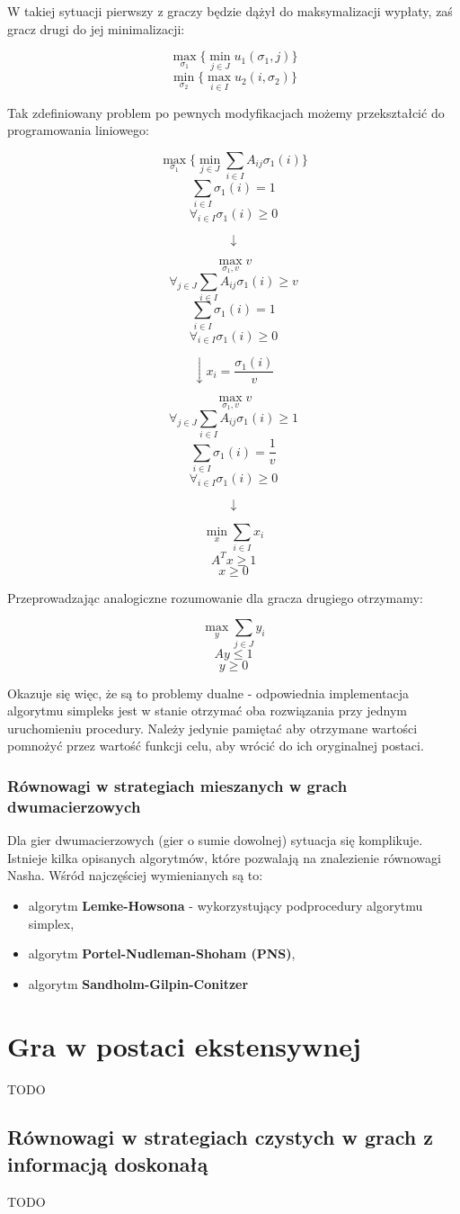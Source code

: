 \documentclass{standalone}
\begin{document}
W takiej sytuacji pierwszy z graczy będzie dążył do maksymalizacji wypłaty, zaś gracz drugi do jej minimalizacji:

$$\max_{\sigma_1} \{ \min_{j \in J} u_1(\sigma_1, j) \}$$
$$\min_{\sigma_2} \{ \max_{i \in I} u_2(i, \sigma_2) \}$$

Tak zdefiniowany problem po pewnych modyfikacjach możemy przekształcić do programowania liniowego:

$$\max_{\sigma_1} \{ \min_{j \in J} \sum_{i \in I} A_{ij} \sigma_1(i) \}$$
$$\sum_{i \in I} \sigma_1(i) = 1$$
$$\forall_{i \in I} \sigma_1(i) \geq 0$$

$$\downarrow$$

$$\max_{\sigma_1,v} v$$
$$\forall_{j \in J} \sum_{i \in I} A_{ij} \sigma_1(i) \geq v$$
$$\sum_{i \in I} \sigma_1(i) = 1$$
$$\forall_{i \in I} \sigma_1(i) \geq 0$$

$$\downarrow x_i = \frac{\sigma_1(i)}{v}$$

$$\max_{\sigma_1,v} v$$
$$\forall_{j \in J} \sum_{i \in I} A_{ij} \sigma_1(i) \geq 1$$
$$\sum_{i \in I} \sigma_1(i) = \frac{1}{v}$$
$$\forall_{i \in I} \sigma_1(i) \geq 0$$

$$\downarrow$$

$$\min_x \sum_{i \in I} x_i$$
$$A^Tx \geq 1$$
$$x \geq 0$$

Przeprowadzając analogiczne rozumowanie dla gracza drugiego otrzymamy:

$$\max_y \sum_{j \in J} y_i$$
$$Ay \leq 1$$
$$y \geq 0$$

Okazuje się więc, że są to problemy dualne - odpowiednia implementacja algorytmu simpleks jest w stanie otrzymać oba rozwiązania
przy jednym uruchomieniu procedury. Należy jedynie pamiętać aby otrzymane wartości pomnożyć przez wartość funkcji celu, aby wrócić
do ich oryginalnej postaci.

\subsubsection{Równowagi w strategiach mieszanych w grach dwumacierzowych}

Dla gier dwumacierzowych (gier o sumie dowolnej) sytuacja się komplikuje. Istnieje kilka opisanych algorytmów, które pozwalają
na znalezienie równowagi Nasha. Wśród najczęściej wymienianych są to:
\begin{itemize}
\item algorytm \textbf{Lemke-Howsona} - wykorzystujący podprocedury algorytmu simplex,
\item algorytm \textbf{Portel-Nudleman-Shoham (PNS)},
\item algorytm \textbf{Sandholm-Gilpin-Conitzer}
\end{itemize}

\section{Gra w postaci ekstensywnej}

TODO

\subsection{Równowagi w strategiach czystych w grach z informacją doskonałą}

TODO
\end{document}
